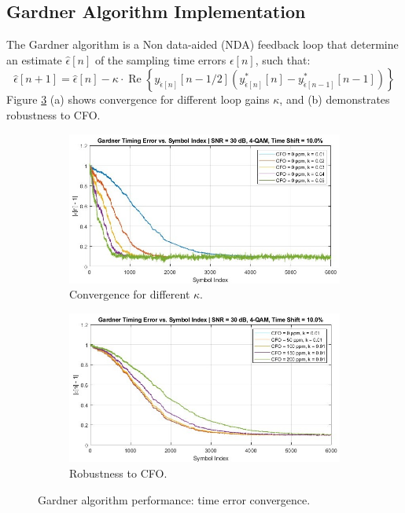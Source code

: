 \documentclass[11pt]{article}
\begin{document}
	\subsection{Gardner Algorithm Implementation}
	The Gardner algorithm is a Non data-aided (NDA) feedback loop that determine an  estimate $\hat{\epsilon}[n]$ of the sampling time errors $\epsilon[n]$, such that: 
	\begin{equation}
		\hat{\epsilon}[n+1] = \hat{\epsilon}[n] - \kappa \cdot \operatorname{Re} \left\{ y_{\hat{\epsilon}[n]}[n-1/2] \left( y_{\hat{\epsilon}[n]}^{*}[n] - y_{\hat{\epsilon}[n-1]}^{*}[n-1] \right) \right\}
	\end{equation}
	Figure \ref{fig:gardner_performance} (a) shows convergence for different loop gains $\kappa$, and (b) demonstrates robustness to CFO.
			
	\begin{figure}[H]
		\centering
		\begin{subfigure}[b]{0.48\textwidth}
			\centering
			\includegraphics[width=\linewidth]{Images/Gardner_k_list.jpg} 
			\caption{Convergence for different $\kappa$.}
			\label{fig:gardner1_compact}
		\end{subfigure}
		\hfill
		\begin{subfigure}[b]{0.48\textwidth}
			\centering
			\includegraphics[width=\linewidth]{Images/Gardner_CFO_robust.jpg} 
			\caption{Robustness to CFO.}
			\label{fig:gardner2_compact}
		\end{subfigure}
		\caption{Gardner algorithm performance: time error convergence.}
		\label{fig:gardner_performance}
	\end{figure}
	
\end{document}
